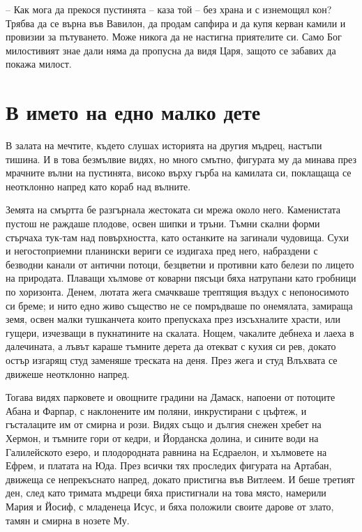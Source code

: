 -- Как мога да прекося пустинята -- каза той -- без храна и с изнемощял кон?
Трябва да се върна във Вавилон, да продам сапфира и да купя керван камили и
провизии за пътуването. Може никога да не настигна приятелите си. Само Бог
милостивият знае дали няма да пропусна да видя Царя, защото се забавих да покажа
милост.

\part{В името на едно малко дете}

В залата на мечтите, където слушах историята на другия мъдрец, настъпи тишина. И
в това безмълвие видях, но много смътно, фигурата му да минава през мрачните
вълни на пустинята, високо върху гърба на камилата си, поклащаща се неотклонно
напред като кораб над вълните.

Земята на смъртта бе разгърнала жестоката си мрежа около него. Каменистата
пустош не раждаше плодове, освен шипки и тръни. Тъмни скални форми стърчаха
тук-там над повърхността, като останките на загинали чудовища. Сухи и
негостоприемни планински вериги се издигаха пред него, набраздени с безводни
канали от антични потоци, безцветни и противни като белези по лицето на
природата. Плаващи хълмове от коварни пясъци бяха натрупани като гробници по
хоризонта. Денем, лютата жега смачкваше трептящия въздух с непоносимото си
бреме; и нито едно живо същество не се помръдваше по онемялата, замираща земя,
освен малки тушканчета които препускаха през изсъхналите храсти, или гущери,
изчезващи в пукнатините на скалата. Нощем, чакалите дебнеха и лаеха в
далечината, а лъвът караше тъмните дерета да отекват с кухия си рев, докато
остър изгарящ студ заменяше треската на деня. През жега и студ Влъхвата се
движеше неотклонно напред.

Тогава видях парковете и овощните градини на Дамаск, напоени от потоците Абана и
Фарпар, с наклонените им поляни, инкрустирани с цъфтеж, и гъсталаците им от
смирна и рози. Видях също и дългия снежен хребет на Хермон, и тъмните гори от
кедри, и Йорданска долина, и сините води на Галилейското езеро, и плодородната
равнина на Есдраелон, и хълмовете на Ефрем, и платата на Юда. През всички тях
проследих фигурата на Артабан, движеща се непрекъснато напред, докато пристигна
във Витлеем. И беше третият ден, след като тримата мъдреци бяха пристигнали на
това място, намерили Мария и Йосиф, с младенеца Исус, и бяха положили своите
дарове от злато, тамян и смирна в нозете Му.

